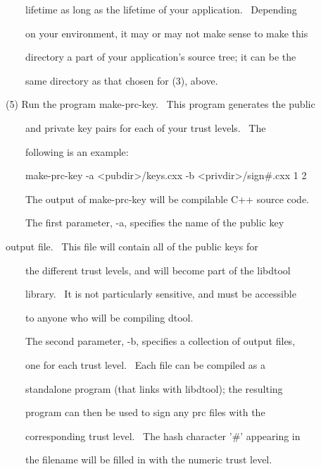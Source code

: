 \documentclass[a4paper]{article}
\begin{document}
{\color{black}
\ \ \ \ lifetime as long as the lifetime of your application. \ Depending}

{\color{black}
\ \ \ \ on your environment, it may or may not make sense to make this}

{\color{black}
\ \ \ \ directory a part of your application's source tree; it can be the}

{\color{black}
\ \ \ \ same directory as that chosen for (3), above.}


\bigskip

{\color{black}
(5) Run the program make-prc-key. \ This program generates the public}

{\color{black}
\ \ \ \ and private key pairs for each of your trust levels. \ The}

{\color{black}
\ \ \ \ following is an example:}


\bigskip

{\color{black}
\ \ \ \ make-prc-key -a {\textless}pubdir{\textgreater}/keys.cxx -b {\textless}privdir{\textgreater}/sign\#.cxx 1 2}


\bigskip

{\color{black}
\ \ \ \ The output of make-prc-key will be compilable C++ source code.}

{\color{black}
\ \ \ \ The first parameter, -a, specifies the name of the public key}

{\color{black}
output file. \ This file will contain all of the public keys for}

{\color{black}
\ \ \ \ the different trust levels, and will become part of the libdtool}

{\color{black}
\ \ \ \ library. \ It is not particularly sensitive, and must be accessible}

{\color{black}
\ \ \ \ to anyone who will be compiling dtool.}


\bigskip

{\color{black}
\ \ \ \ The second parameter, -b, specifies a collection of output files,}

{\color{black}
\ \ \ \ one for each trust level. \ Each file can be compiled as a}

{\color{black}
\ \ \ \ standalone program (that links with libdtool); the resulting}

{\color{black}
\ \ \ \ program can then be used to sign any prc files with the}

{\color{black}
\ \ \ \ corresponding trust level. \ The hash character '\#' appearing in}

{\color{black}
\ \ \ \ the filename will be filled in with the numeric trust level.}
\end{document}
